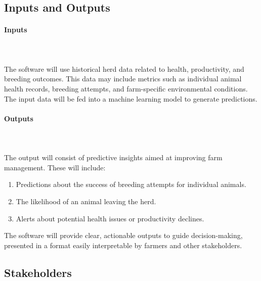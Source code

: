 \documentclass{article}
\begin{document}



\subsection{Inputs and Outputs}

\paragraph{Inputs} \ \\
\\
The software will use historical herd data related to health, productivity, and 
breeding outcomes. This data may include metrics such as individual animal 
health records, breeding attempts, and farm-specific environmental conditions. 
The input data will be fed into a machine learning model to generate 
predictions.

\paragraph{Outputs} \ \\
\\
The output will consist of predictive insights aimed at improving farm 
management. These will include:
\begin{enumerate}
    \item Predictions about the success of breeding attempts for individual 
    animals.
    \item The likelihood of an animal leaving the herd.
    \item Alerts about potential health issues or productivity declines.
\end{enumerate}

The software will provide clear, actionable outputs to guide decision-making, 
presented in a format easily interpretable by farmers and other stakeholders.



\subsection{Stakeholders}
\end{document}
